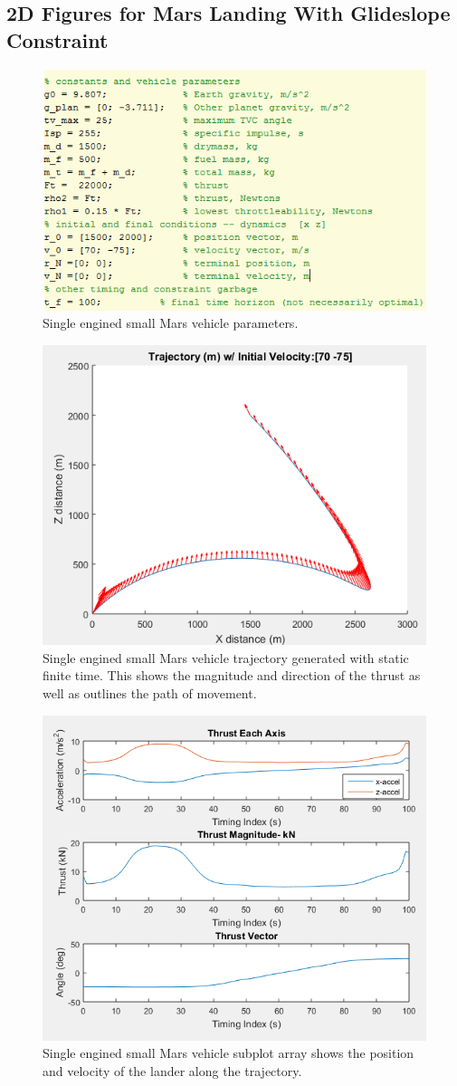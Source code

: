 \documentclass[journal]{new-aiaa}
\begin{document}
\begin{singlespace}
\subsection{2D Figures for Mars Landing With Glideslope Constraint}
  \begin{figure}[!htb] 
  \centering
  \includegraphics[width=.6\textwidth]{marsparam.PNG}
  \caption{Single engined small Mars vehicle parameters.}
  \label{fig:param}
  \end{figure}
  \begin{figure}[!htb] 
  \centering
  \includegraphics[width=.6\textwidth]{marstraj.PNG}
  \caption{Single engined small Mars vehicle trajectory generated with static finite time. This shows the magnitude and direction of the thrust as well as outlines the path of movement.}
  \label{fig:traj}
  \end{figure}
  \begin{figure}[!htb] 
  \centering
  \includegraphics[width=.6\textwidth]{marsposvel.PNG}
  \caption{Single engined small Mars vehicle subplot array shows the position and velocity of the lander along the trajectory.}
  \label{fig:posvel}
  \end{figure}


\end{singlespace}
\end{document}
